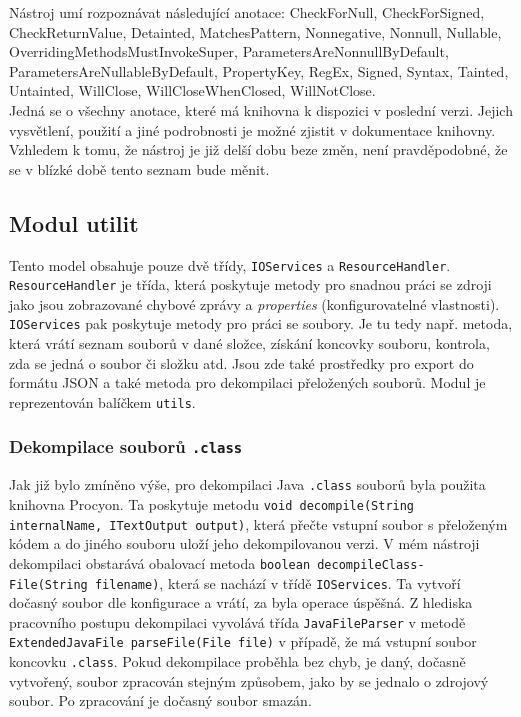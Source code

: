 				Nástroj umí rozpoznávat následující anotace: CheckForNull, CheckForSigned, CheckReturnValue, Detainted, MatchesPattern, Nonnegative, Nonnull, Nullable, OverridingMethodsMustInvokeSuper, ParametersAreNonnullByDefault, ParametersAreNullableByDefault, PropertyKey, RegEx, Signed, Syntax, Tainted, Untainted, WillClose, WillCloseWhenClosed, WillNotClose.\\
				
				Jedná se o všechny anotace, které má knihovna k dispozici v poslední verzi. Jejich vysvětlení, použití a jiné podrobnosti je možné zjistit v dokumentace knihovny. Vzhledem k tomu, že nástroj je již delší dobu beze změn, není pravděpodobné, že se v blízké době tento seznam bude měnit. 
			
		

		
		\subsection{Modul utilit}	
			Tento model obsahuje pouze dvě třídy, \texttt{IOServices} a \texttt{ResourceHandler}. \texttt{ResourceHandler} je třída, která poskytuje metody pro snadnou práci se zdroji jako jsou zobrazované chybové zprávy a \emph{properties} (konfigurovatelné vlastnosti). \texttt{IOServices} pak poskytuje metody pro práci se soubory. Je tu tedy např. metoda, která vrátí seznam souborů v dané složce, získání koncovky souboru, kontrola, zda se jedná o soubor či složku atd. Jsou zde také prostředky pro export do formátu JSON a také metoda pro dekompilaci přeložených souborů. Modul je reprezentován balíčkem \texttt{utils}.
		
		\subsubsection{Dekompilace souborů \texttt{.class}}
			Jak již bylo zmíněno výše, pro dekompilaci Java \texttt{.class} souborů byla použita knihovna Procyon. Ta poskytuje metodu \texttt{void decompile(String internalName, ITextOutput output)}, která přečte vstupní soubor s přeloženým kódem a do jiného souboru uloží jeho dekompilovanou verzi. V mém nástroji dekompilaci obstarává obalovací metoda \texttt{boolean decompileClass-\\File(String filename)}, která se nachází v třídě \texttt{IOServices}. Ta vytvoří dočasný soubor dle konfigurace a vrátí, za byla operace úspěšná. Z hlediska pracovního postupu dekompilaci vyvolává třída \texttt{JavaFileParser} v metodě \texttt{ExtendedJavaFile parseFile(File file)} v případě, že má vstupní soubor koncovku \texttt{.class}. Pokud dekompilace proběhla bez chyb, je daný, dočasně vytvořený, soubor zpracován stejným způsobem, jako by se jednalo o zdrojový soubor. Po zpracování je dočasný soubor smazán.
					

